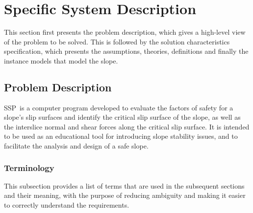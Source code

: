 \documentclass[12pt]{article}
\newcommand{\progname}{SSP}
\begin{document}
\section{Specific System Description}

This section first presents the problem description, which gives a
high-level view of the problem to be solved.  This is followed by the
solution characteristics specification, which presents the
assumptions, theories, definitions and finally the instance models
that model the slope. \\

\subsection{Problem Description} \label{Sec_pd}

\progname\ is a computer program developed to evaluate the factors of safety 
for a slope's slip surfaces and identify the critical slip surface of the 
slope, as well as the interslice normal and shear forces along the critical 
slip surface. It is intended to be used as an educational tool for introducing 
slope stability issues, and to facilitate the analysis and design of a safe 
slope.

\subsubsection{Terminology}

This subsection provides a list of terms that are used in the subsequent
sections and their meaning, with the purpose of reducing ambiguity and
 making it easier to correctly understand the requirements.
\end{document}
